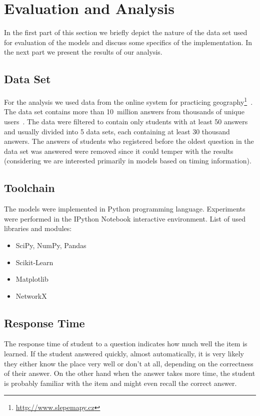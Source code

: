 \chapter{Evaluation and Analysis}

In the first part of this section we briefly depict the nature of the data set used for evaluation of the models and discuss some specifics of the implementation. In the next part we present the results of our analysis.

\section{Data Set}


For the analysis we used data from the online system for practicing geography\footnote{\url{http://www.slepemapy.cz}}~\cite{Papousek2014}. The data set contains more than 10~million answers from thousands of unique users~\cite{Papousek2015}. The data were filtered to contain only students with at least 50 answers and usually divided into 5 data sets, each containing at least 30 thousand answers. The answers of students who registered before the oldest question in the data set was answered were removed since it could temper with the results (considering we are interested primarily in models based on timing information).

\section{Toolchain}

The models were implemented in Python programming language. Experiments were performed in the IPython Notebook interactive environment. List of used libraries and modules:

\begin{itemize}
  \item SciPy, NumPy, Pandas
  \item Scikit-Learn
  \item Matplotlib
  \item NetworkX
\end{itemize}

\section{Response Time}

The response time of student to a question indicates how much well the item is learned. If the student answered quickly, almost automatically, it is very likely they either know the place very well or don't at all, depending on the correctness of their answer. On the other hand when the answer takes more time, the student is probably familiar with the item and might even recall the correct answer.

